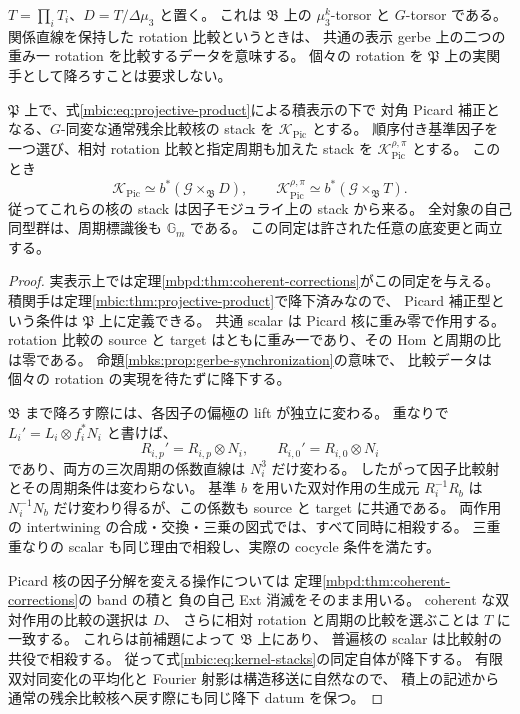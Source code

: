 $T=\prod_iT_i$、$D=T/\Delta\mu_3$ と置く。
これは $\mathfrak B$ 上の $\mu_3^k$-torsor と $G$-torsor である。
関係直線を保持した rotation 比較というときは、
共通の表示 gerbe 上の二つの重み一 rotation を比較するデータを意味する。
個々の rotation を $\mathfrak P$ 上の実関手として降ろすことは要求しない。

\begin{theorem}
\label{mbic:thm:kernel-stack}
$\mathfrak P$ 上で、式\eqref{mbic:eq:projective-product}による積表示の下で
対角 Picard 補正となる、$G$-同変な通常残余比較核の stack を
$\mathscr K_{\mathrm{Pic}}$ とする。
順序付き基準因子を一つ選び、相対 rotation 比較と指定周期も加えた stack を
$\mathscr K_{\mathrm{Pic}}^{\rho,\pi}$ とする。
このとき
\begin{equation}\label{mbic:eq:kernel-stacks}
 \mathscr K_{\mathrm{Pic}}
     \simeq b^*(\mathscr G\times_{\mathfrak B}D),\qquad
 \mathscr K_{\mathrm{Pic}}^{\rho,\pi}
     \simeq b^*(\mathscr G\times_{\mathfrak B}T).
\end{equation}
従ってこれらの核の stack は因子モジュライ上の stack から来る。
全対象の自己同型群は、周期標識後も $\mathbb G_m$ である。
この同定は許された任意の底変更と両立する。
\end{theorem}
\begin{proof}
実表示上では定理\ref{mbpd:thm:coherent-corrections}がこの同定を与える。
積関手は定理\ref{mbic:thm:projective-product}で降下済みなので、
Picard 補正型という条件は $\mathfrak P$ 上に定義できる。
共通 scalar は Picard 核に重み零で作用する。
rotation 比較の source と target はともに重み一であり、その Hom と周期の比は零である。
命題\ref{mbks:prop:gerbe-synchronization}の意味で、
比較データは個々の rotation の実現を待たずに降下する。

$\mathfrak B$ まで降ろす際には、各因子の偏極の lift が独立に変わる。
重なりで $L_i'=L_i\otimes f_i^*N_i$ と書けば、
\[
 R_{i,p}'=R_{i,p}\otimes N_i,\qquad
 R_{i,0}'=R_{i,0}\otimes N_i
\]
であり、両方の三次周期の係数直線は $N_i^3$ だけ変わる。
したがって因子比較射とその周期条件は変わらない。
基準 $b$ を用いた双対作用の生成元 $R_i^{-1}R_b$ は
$N_i^{-1}N_b$ だけ変わり得るが、この係数も source と target に共通である。
両作用の intertwining の合成・交換・三乗の図式では、すべて同時に相殺する。
三重重なりの scalar も同じ理由で相殺し、実際の cocycle 条件を満たす。

Picard 核の因子分解を変える操作については
定理\ref{mbpd:thm:coherent-corrections}の band の積と
負の自己 Ext 消滅をそのまま用いる。
coherent な双対作用の比較の選択は $D$、
さらに相対 rotation と周期の比較を選ぶことは $T$ に一致する。
これらは前補題によって $\mathfrak B$ 上にあり、
普遍核の scalar は比較射の共役で相殺する。
従って式\eqref{mbic:eq:kernel-stacks}の同定自体が降下する。
有限双対同変化の平均化と Fourier 射影は構造移送に自然なので、
積上の記述から通常の残余比較核へ戻す際にも同じ降下 datum を保つ。
\end{proof}


